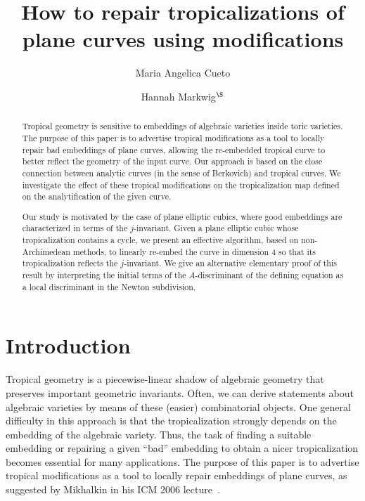 \documentclass[11pt]{amsart}
\title{How to repair tropicalizations of plane curves using modifications}
\author
{
Maria Angelica Cueto
}
\author[Hannah Markwig]{Hannah Markwig${}^{\S}$}
\numberwithin{equation}{section}
\theoremstyle{plain}
\theoremstyle{definition}
\theoremstyle{remark}
\begin{document}
\begin{abstract} Tropical geometry is sensitive to embeddings of
  algebraic varieties inside toric varieties.
  The purpose of this paper is to advertise tropical modifications as
  a tool to locally repair bad embeddings of plane curves, allowing
  the re-embedded tropical curve to better reflect the geometry of the input
  curve. Our approach is based on the close connection between
  analytic curves (in the sense of Berkovich) and tropical curves. 
We investigate the effect of these tropical modifications on
  the tropicalization map defined on the analytification of the given curve. 

  Our study is motivated by the case of plane elliptic cubics, where
  good embeddings are characterized in terms of the $j$-invariant.
  Given a plane elliptic cubic whose tropicalization contains a cycle,
  we present an effective algorithm, based on non-Archimedean methods,
  to linearly re-embed the curve in dimension 4 so that its
  tropicalization reflects the $j$-invariant.  We give an alternative
  elementary proof of this result by interpreting the initial terms of
  the $A$-discriminant of the defining equation as a local
  discriminant in the Newton subdivision.
  \end{abstract}
 \maketitle

  \section{Introduction}\label{sec:intro}

Tropical geometry is a piecewise-linear shadow of algebraic geometry that
preserves important geometric invariants.
Often, we can derive statements about  algebraic varieties by means
of these (easier) combinatorial objects.  One general difficulty in
this approach is that the tropicalization strongly depends on the
embedding of the algebraic variety. Thus, the task of finding a
suitable embedding or  repairing a given ``bad'' embedding to obtain
a nicer tropicalization becomes essential for many applications.  The
purpose of this paper is to advertise tropical modifications as a tool
to locally repair embeddings of plane curves, as suggested by
Mikhalkin in his ICM 2006 lecture~\cite{Mi06}.
\end{document}
